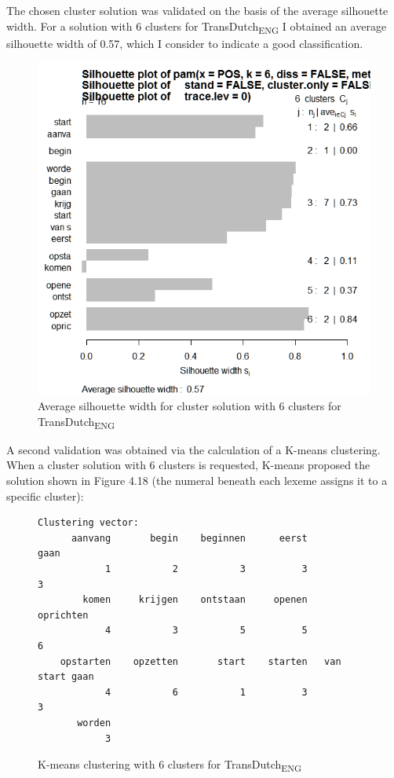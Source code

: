 The chosen cluster solution was validated on the basis of the average silhouette width. For a solution with 6 clusters for TransDutch\textsubscript{ENG} I obtained an average silhouette width of 0.57, which I consider to indicate a good classification.

\begin{figure}
\includegraphics[height=.4\textheight]{figures/Vandevoorde2-img66.png}
\caption{\label{fig:4:65}  Average silhouette width for cluster solution with 6 clusters for TransDutch\textsubscript{ENG}}
\end{figure}

A second validation was obtained via the calculation of a K-means clustering. When a cluster solution with 6 clusters is requested, K-means proposed the solution shown in Figure 4.18 (the numeral beneath each lexeme assigns it to a specific cluster):

\begin{figure}
\footnotesize
\begin{lstlisting}
Clustering vector:
      aanvang       begin    beginnen      eerst             gaan 
            1           2           3          3                3         
        komen     krijgen    ontstaan     openen        oprichten         
            4           3           5          5                6         
    opstarten    opzetten       start    starten   van start gaan         
            4           6           1          3                3         
       worden                                            
            3                                      
\end{lstlisting}                                   
 

\caption{\label{fig:4:66}  K-means clustering with 6 clusters for TransDutch\textsubscript{ENG}}
\end{figure}

